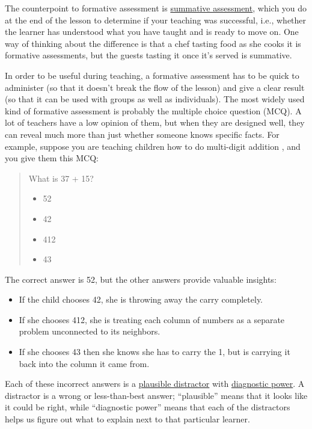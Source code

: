 The counterpoint to formative assessment is
\protect\hyperlink{g:summative-assessment}{summative assessment}, which you do
at the end of the lesson to determine if your teaching was successful,
i.e., whether the learner has understood what you have taught and is
ready to move on. One way of thinking about the difference is that a
chef tasting food as she cooks it is formative assessments, but the
guests tasting it once it's served is summative.

In order to be useful during teaching, a formative assessment has to be
quick to administer (so that it doesn't break the flow of the lesson)
and give a clear result (so that it can be used with groups as well as
individuals). The most widely used kind of formative assessment is
probably the multiple choice question (MCQ). A lot of teachers have a
low opinion of them, but when they are designed well, they can reveal
much more than just whether someone knows specific facts. For example,
suppose you are teaching children how to do multi-digit addition
\cite{Ojos2015}, and you give them this MCQ:

\begin{quote}\setlength{\parindent}{0pt}
What is 37 + 15?

\begin{itemize}
\tightlist
\item
  52
\item
  42
\item
  412
\item
  43
\end{itemize}
\end{quote}

The correct answer is 52, but the other answers provide valuable
insights:

\begin{itemize}
\item
  If the child chooses 42, she is throwing away the carry completely.
\item
  If she chooses 412, she is treating each column of numbers as a
  separate problem unconnected to its neighbors.
\item
  If she chooses 43 then she knows she has to carry the 1, but is
  carrying it back into the column it came from.
\end{itemize}

Each of these incorrect answers is a \protect\hyperlink{g:plausible-distractor}{plausible
distractor} with \protect\hyperlink{g:diagnostic-power}{diagnostic
power}. A distractor is a wrong or less-than-best
answer; ``plausible'' means that it looks like it could be right, while
``diagnostic power'' means that each of the distractors helps us figure
out what to explain next to that particular learner.

